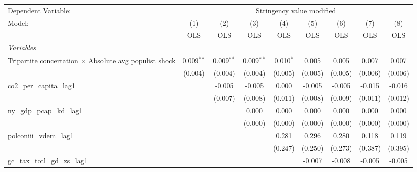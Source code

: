 
\begingroup
\centering
\begin{tabular}{lcccccccc}
   \toprule
   Dependent Variable: & \multicolumn{8}{c}{Stringency value modified}\\
   Model:                                                        & (1)          & (2)          & (3)          & (4)         & (5)     & (6)     & (7)         & (8)\\  
                                                                 &  OLS         & OLS          & OLS          & OLS         & OLS     & OLS     & OLS         & OLS\\  
   \midrule
   \emph{Variables}\\
   Tripartite concertation $\times$ Absolute avg populist shock  & 0.009$^{**}$ & 0.009$^{**}$ & 0.009$^{**}$ & 0.010$^{*}$ & 0.005   & 0.005   & 0.007       & 0.007\\   
                                                                 & (0.004)      & (0.004)      & (0.004)      & (0.005)     & (0.005) & (0.005) & (0.006)     & (0.006)\\   
   co2\_per\_capita\_lag1                                        &              & -0.005       & -0.005       & 0.000       & -0.005  & -0.005  & -0.015      & -0.016\\   
                                                                 &              & (0.007)      & (0.008)      & (0.011)     & (0.008) & (0.009) & (0.011)     & (0.012)\\   
   ny\_gdp\_pcap\_kd\_lag1                                       &              &              & 0.000        & 0.000       & 0.000   & 0.000   & 0.000       & 0.000\\   
                                                                 &              &              & (0.000)      & (0.000)     & (0.000) & (0.000) & (0.000)     & (0.000)\\   
   polconiii\_vdem\_lag1                                         &              &              &              & 0.281       & 0.296   & 0.280   & 0.118       & 0.119\\   
                                                                 &              &              &              & (0.247)     & (0.250) & (0.273) & (0.387)     & (0.395)\\   
   gc\_tax\_totl\_gd\_zs\_lag1                                   &              &              &              &             & -0.007  & -0.008  & -0.005      & -0.005\\   

\end{tabular}
